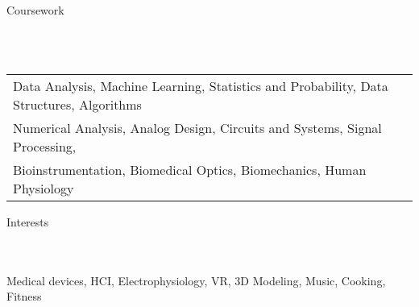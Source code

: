 \documentclass{article}
\newcommand{\lineunder} {
    \vspace*{-8pt} \\
    \hspace*{-18pt} \hrulefill \\
}
\newcommand{\header} [1] {
    {\hspace*{-18pt}\vspace*{6pt} \Large{#1} }
    \vspace*{-6pt} 
    \lineunder
}
\begin{document}
%
\vspace{5mm}
\header{Coursework}
\vspace{1mm}
\begin{tabular}{ l l }
	Data Analysis, Machine Learning, Statistics and Probability, Data Structures, Algorithms \\
	Numerical Analysis, Analog Design, Circuits and Systems, Signal Processing, \\
	Bioinstrumentation, Biomedical Optics, Biomechanics, Human Physiology
\end{tabular}
\vspace{5mm}

\header{Interests}
Medical devices, HCI, Electrophysiology, VR, 3D Modeling, Music, Cooking, Fitness
\end{document}
